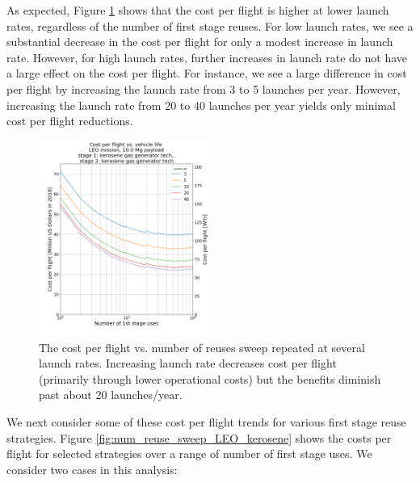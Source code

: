 \documentclass[conf]{new-aiaa}
\begin{document}
\begin{multicols}{2}
As expected, Figure \ref{fig:cpf_reuses_sweep_vary_launch_rate} shows that the cost per flight is higher at lower launch rates, regardless of the number of first stage reuses. For low launch rates, we see a substantial decrease in the cost per flight for only a modest increase in launch rate. However, for high launch rates, further increases in launch rate do not have a large effect on the cost per flight. For instance, we see a large difference in cost per flight by increasing the launch rate from 3 to 5 launches per year. However, increasing the launch rate from 20 to 40 launches per year yields only minimal cost per flight reductions. 

\begin{figure}[H]
    \centering
    \includegraphics[width=0.5\textwidth]{../../lvreuse/analysis/combined/plots/cpf_reuses_sweep_vary_launch_rate}
    \caption{\label{fig:cpf_reuses_sweep_vary_launch_rate} The cost per flight vs. number of reuses sweep repeated at several launch rates. Increasing launch rate decreases cost per flight (primarily through lower operational costs) but the benefits diminish past about 20 launches/year.}
\end{figure}

We next consider some of these cost per flight trends for various first stage reuse strategies. Figure \ref{fig:num_reuse_sweep_LEO_kerosene} shows the costs per flight for selected strategies over a range of number of first stage uses. We consider two cases in this analysis: 


\end{multicols}
\end{document}
